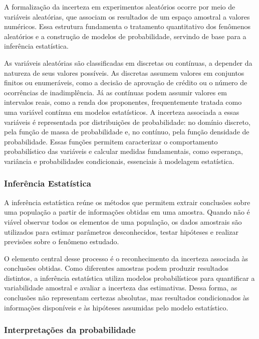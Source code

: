 \documentclass[
  brazilian,
  12pt,
  letterpaper,
  DIV=11,
  numbers=noendperiod]{scrartcl}
\begin{document}
A formalização da incerteza em experimentos aleatórios ocorre por meio
de variáveis aleatórias, que associam os resultados de um espaço
amostral a valores numéricos. Essa estrutura fundamenta o tratamento
quantitativo dos fenômenos aleatórios e a construção de modelos de
probabilidade, servindo de base para a inferência estatística.

As variáveis aleatórias são classificadas em discretas ou contínuas, a
depender da natureza de seus valores possíveis. As discretas assumem
valores em conjuntos finitos ou enumeráveis, como a decisão de aprovação
de crédito ou o número de ocorrências de inadimplência. Já as contínuas
podem assumir valores em intervalos reais, como a renda dos proponentes,
frequentemente tratada como uma variável contínua em modelos
estatísticos. A incerteza associada a essas variáveis é representada por
distribuições de probabilidade: no domínio discreto, pela função de
massa de probabilidade e, no contínuo, pela função densidade de
probabilidade. Essas funções permitem caracterizar o comportamento
probabilístico das variáveis e calcular medidas fundamentais, como
esperança, variância e probabilidades condicionais, essenciais à
modelagem estatística.

\subsubsection{Inferência
Estatística}\label{inferuxeancia-estatuxedstica}

A inferência estatística reúne os métodos que permitem extrair
conclusões sobre uma população a partir de informações obtidas em uma
amostra. Quando não é viável observar todos os elementos de uma
população, os dados amostrais são utilizados para estimar parâmetros
desconhecidos, testar hipóteses e realizar previsões sobre o fenômeno
estudado.

O elemento central desse processo é o reconhecimento da incerteza
associada às conclusões obtidas. Como diferentes amostras podem produzir
resultados distintos, a inferência estatística utiliza modelos
probabilísticos para quantificar a variabilidade amostral e avaliar a
incerteza das estimativas. Dessa forma, as conclusões não representam
certezas absolutas, mas resultados condicionados às informações
disponíveis e às hipóteses assumidas pelo modelo estatístico.

\subsubsection{Interpretações da
probabilidade}\label{interpretauxe7uxf5es-da-probabilidade}
\end{document}
